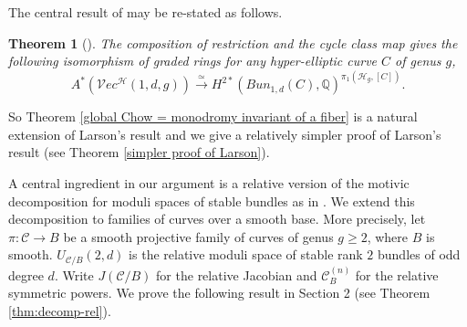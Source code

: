 \documentclass[11pt]{amsart}
\newtheorem*{theorem*}{Theorem}
\theoremstyle{definition}
\begin{document}
\noindent The central result of \cite{larson-24} may be re-stated as follows.
\begin{theorem*}[\cite{larson-24}]
    The composition of restriction and the cycle class map gives the following isomorphism of graded rings for any hyper-elliptic curve $C$ of genus $g$,
    \begin{equation*}
        A^* (\mathcal Vec^\mathcal H(1,d,g)) \xrightarrow{\simeq} H^{2*} (Bun_{1,d}(C),\mathbb Q)^{\pi_1(\mathcal H_g, [C])} .
    \end{equation*}
\end{theorem*}\noindent So Theorem \ref{global Chow = monodromy invariant of a fiber} is a natural extension of Larson's result and we give a relatively simpler proof of Larson's result (see Theorem \ref{simpler proof of Larson}).  

A central ingredient in our argument is a relative version of the motivic decomposition for moduli spaces of stable bundles as in \cite{hoskins}. We extend this decomposition to families of curves over a smooth base. More precisely, let $\pi: \mathcal C \rightarrow B$ be a smooth projective family of curves of genus $g\geq 2$, where $B$ is smooth. $U_{\mathcal C/B}(2,d)$ is the relative moduli space of stable rank $2$ bundles of odd degree $d$. Write $J(\mathcal C/B)$ for the relative Jacobian and $\mathcal C_B^{(n)}$ for the relative symmetric powers. We prove the following result in Section 2 (see Theorem \ref{thm:decomp-rel}).
\end{document}
